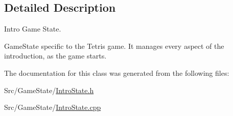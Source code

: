 \subsection{Detailed Description}
Intro Game State. 

Game\-State specific to the Tetris game. It manages every aspect of the introduction, as the game starts. 

The documentation for this class was generated from the following files\-:\begin{DoxyCompactItemize}
\item 
Src/\-Game\-State/\hyperlink{IntroState_8h}{Intro\-State.\-h}\item 
Src/\-Game\-State/\hyperlink{IntroState_8cpp}{Intro\-State.\-cpp}\end{DoxyCompactItemize}
